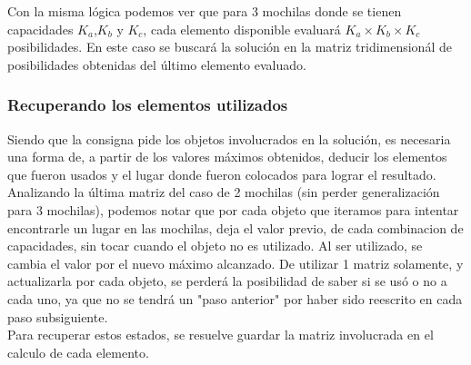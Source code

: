   Con la misma lógica podemos ver que para 3 mochilas donde se tienen capacidades  $K_{a}$,$K_{b}$ y $K_{c}$, cada elemento disponible evaluará $K_{a} \times K_{b} \times K_{c}$ posibilidades. En este caso se buscará la solución en la matriz tridimensionál de posibilidades obtenidas del último elemento evaluado.

\subsubsection*{Recuperando los elementos utilizados}

Siendo que la consigna pide los objetos involucrados en la solución, es necesaria una forma de, a partir de los valores máximos obtenidos, deducir los elementos que fueron usados y el lugar donde fueron colocados para lograr el resultado.\\

Analizando la última matriz del caso de 2 mochilas (sin perder generalización para 3 mochilas), podemos notar que por cada objeto que iteramos para intentar encontrarle un lugar en las mochilas, deja el valor previo, de cada combinacion de capacidades, sin tocar cuando el objeto no es utilizado. Al ser utilizado, se cambia el valor por el nuevo máximo alcanzado. De utilizar 1 matriz solamente, y actualizarla por cada objeto, se perderá la posibilidad de saber si se usó o no a cada uno, ya que no se tendrá un "paso anterior" por haber sido reescrito en cada paso subsiguiente. \\

Para recuperar estos estados, se resuelve guardar la matriz involucrada en el calculo de cada elemento.